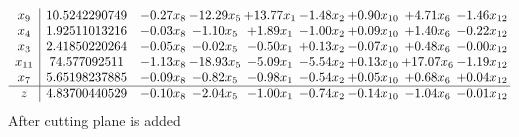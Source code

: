 \documentclass[8pt]{article}
\begin{document}
\[\begin{array}{c| c c@{\hskip 2pt} c@{\hskip 2pt} c@{\hskip 2pt} c@{\hskip 2pt} c@{\hskip 2pt} c@{\hskip 2pt} c@{\hskip 2pt} }
 x_{9}   &  10.5242290749 & -0.27 x_{8} & -12.29 x_{5} & + 13.77 x_{1} & -1.48 x_{2} & +  0.90 x_{10} & +  4.71 x_{6} & -1.46 x_{12}\\
 x_{4}   &  1.92511013216 & -0.03 x_{8} & -1.10 x_{5} & +  1.89 x_{1} & -1.00 x_{2} & +  0.09 x_{10} & +  1.40 x_{6} & -0.22 x_{12}\\
 x_{3}   &  2.41850220264 & -0.05 x_{8} & -0.02 x_{5} & -0.50 x_{1} & +  0.13 x_{2} & -0.07 x_{10} & +  0.48 x_{6} & -0.00 x_{12}\\
 x_{11}   &  74.577092511 & -1.13 x_{8} & -18.93 x_{5} & -5.09 x_{1} & -5.54 x_{2} & +  0.13 x_{10} & + 17.07 x_{6} & -1.19 x_{12}\\
 x_{7}   &  5.65198237885 & -0.09 x_{8} & -0.82 x_{5} & -0.98 x_{1} & -0.54 x_{2} & +  0.05 x_{10} & +  0.68 x_{6} & +  0.04 x_{12}\\
\hline
z    &  4.83700440529 & -0.10 x_{8} & -2.04 x_{5} & -1.00 x_{1} & -0.74 x_{2} & -0.14 x_{10} & -1.04 x_{6} & -0.01 x_{12}\\
\end{array}\]
 After cutting plane is added 
\end{document}

